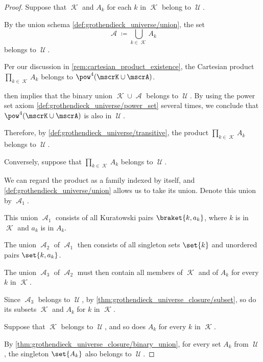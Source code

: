 \begin{proof}
  \SufficiencySubProof* Suppose that \( \mscrK \) and \( A_k \) for each \( k \) in \( \mscrK \) belong to \( \mscrU \).

  By the union schema \ref{def:grothendieck_universe/union}, the set
  \begin{equation*}
    \mscrA \coloneqq \bigcup_{k \in \mscrK} A_k
  \end{equation*}
  belongs to \( \mscrU \).

  Per our discussion in \cref{rem:cartesian_product_existence}, the Cartesian product \( \prod_{k \in \mscrK} A_k \) belongs to \( \pow^4(\mscrK \cup \mscrA) \).

   then implies that the binary union \( \mscrK \cup \mscrA \) belongs to \( \mscrU \). By using the power set axiom \ref{def:grothendieck_universe/power_set} several times, we conclude that \( \pow^4(\mscrK \cup \mscrA) \) is also in \( \mscrU \).

  Therefore, by \ref{def:grothendieck_universe/transitive}, the product \( \prod_{k \in \mscrK} A_k \) belongs to \( \mscrU \).

  \NecessitySubProof* Conversely, suppose that \( \prod_{k \in \mscrK} A_k \) belongs to \( \mscrU \).

  We can regard the product as a family indexed by itself, and \ref{def:grothendieck_universe/union} allows us to take its union. Denote this union by \( \mscrA_1 \).

  This union \( \mscrA_1 \) consists of all Kuratowski pairs \( \braket{ k, a_k } \), where \( k \) is in \( \mscrK \) and \( a_k \) is in \( A_k \).

  The union \( \mscrA_2 \) of \( \mscrA_1 \) then consists of all singleton sets \( \set{ k } \) and unordered pairs \( \set{ k, a_k } \).

  The union \( \mscrA_3 \) of \( \mscrA_2 \) must then contain all members of \( \mscrK \) and of \( A_k \) for every \( k \) in \( \mscrK \).

  Since \( \mscrA_3 \) belongs to \( \mscrU \), by \cref{thm:grothendieck_universe_closure/subset}, so do its subsets \( \mscrK \) and \( A_k \) for \( k \) in \( \mscrK \).


  \SufficiencySubProof* Suppose that \( \mscrK \) belongs to \( \mscrU \), and so does \( A_k \) for every \( k \) in \( \mscrK \).

  By \cref{thm:grothendieck_universe_closure/binary_union}, for every set \( A_k \) from \( \mscrU \), the singleton \( \set{ A_k } \) also belongs to \( \mscrU \).


\end{proof}
